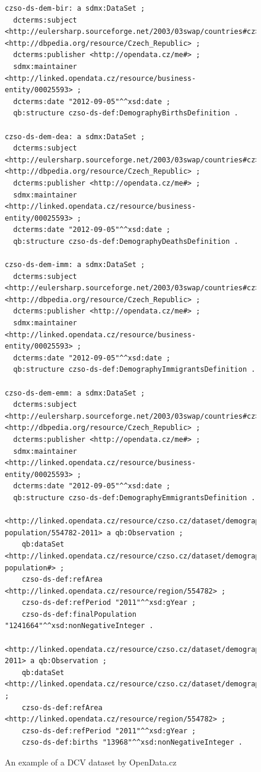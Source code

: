 \begin{figure}
\begin{verbatim}
czso-ds-dem-bir: a sdmx:DataSet ;
  dcterms:subject <http://eulersharp.sourceforge.net/2003/03swap/countries#cz>, <http://dbpedia.org/resource/Czech_Republic> ;
  dcterms:publisher <http://opendata.cz/me#> ;
  sdmx:maintainer <http://linked.opendata.cz/resource/business-entity/00025593> ;
  dcterms:date "2012-09-05"^^xsd:date ;
  qb:structure czso-ds-def:DemographyBirthsDefinition .
  
czso-ds-dem-dea: a sdmx:DataSet ;
  dcterms:subject <http://eulersharp.sourceforge.net/2003/03swap/countries#cz>, <http://dbpedia.org/resource/Czech_Republic> ;
  dcterms:publisher <http://opendata.cz/me#> ;
  sdmx:maintainer <http://linked.opendata.cz/resource/business-entity/00025593> ;
  dcterms:date "2012-09-05"^^xsd:date ;
  qb:structure czso-ds-def:DemographyDeathsDefinition .
  
czso-ds-dem-imm: a sdmx:DataSet ;
  dcterms:subject <http://eulersharp.sourceforge.net/2003/03swap/countries#cz>, <http://dbpedia.org/resource/Czech_Republic> ;
  dcterms:publisher <http://opendata.cz/me#> ;
  sdmx:maintainer <http://linked.opendata.cz/resource/business-entity/00025593> ;
  dcterms:date "2012-09-05"^^xsd:date ;
  qb:structure czso-ds-def:DemographyImmigrantsDefinition .
  
czso-ds-dem-emm: a sdmx:DataSet ;
  dcterms:subject <http://eulersharp.sourceforge.net/2003/03swap/countries#cz>, <http://dbpedia.org/resource/Czech_Republic> ;
  dcterms:publisher <http://opendata.cz/me#> ;
  sdmx:maintainer <http://linked.opendata.cz/resource/business-entity/00025593> ;
  dcterms:date "2012-09-05"^^xsd:date ;
  qb:structure czso-ds-def:DemographyEmmigrantsDefinition .
  
<http://linked.opendata.cz/resource/czso.cz/dataset/demography/final-population/554782-2011> a qb:Observation ;
    qb:dataSet <http://linked.opendata.cz/resource/czso.cz/dataset/demography/final-population#> ;
    czso-ds-def:refArea <http://linked.opendata.cz/resource/region/554782> ;
    czso-ds-def:refPeriod "2011"^^xsd:gYear ;
    czso-ds-def:finalPopulation "1241664"^^xsd:nonNegativeInteger .

<http://linked.opendata.cz/resource/czso.cz/dataset/demography/births/554782-2011> a qb:Observation ;
    qb:dataSet <http://linked.opendata.cz/resource/czso.cz/dataset/demography/births#> ;
    czso-ds-def:refArea <http://linked.opendata.cz/resource/region/554782> ;
    czso-ds-def:refPeriod "2011"^^xsd:gYear ;
    czso-ds-def:births "13968"^^xsd:nonNegativeInteger .
\end{verbatim}\normalsize
\caption{An example of a DCV dataset by OpenData.cz}
\label{fig:example-dcv-dataset}
\end{figure}

